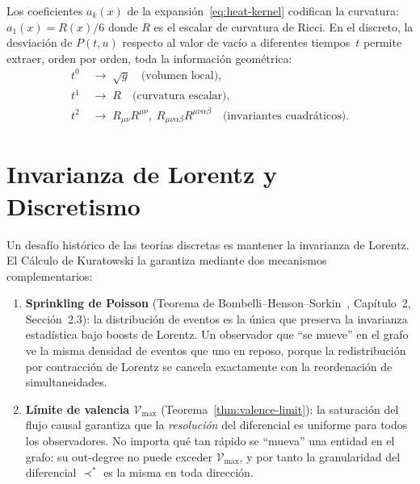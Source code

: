\documentclass[11pt, a4paper, openany]{book}
\newcommand{\covers}{\prec^{\!*}}
\begin{document}
\noindent
Los coeficientes $a_k(x)$ de la
expansi\'on~\eqref{eq:heat-kernel} codifican la curvatura:
$a_1(x) = R(x)/6$ donde $R$ es el escalar de curvatura de Ricci. En
el discreto, la desviaci\'on de $P(t,u)$ respecto al valor de vac\'io
a diferentes tiempos~$t$ permite extraer, orden por orden, toda la
informaci\'on geom\'etrica:
\begin{align}
  t^0 &\;\to\; \sqrt{g} \quad\text{(volumen local)},
  \label{eq:heat-order0}\\
  t^1 &\;\to\; R \quad\text{(curvatura escalar)},
  \label{eq:heat-order1}\\
  t^2 &\;\to\; R_{\mu\nu}R^{\mu\nu},\;
  R_{\mu\nu\alpha\beta}R^{\mu\nu\alpha\beta}
  \quad\text{(invariantes cuadr\'aticos)}.
  \label{eq:heat-order2}
\end{align}

\section{Invarianza de Lorentz y Discretismo}

Un desaf\'io hist\'orico de las teor\'ias discretas es mantener la
invarianza de Lorentz. El C\'alculo de Kuratowski la garantiza
mediante dos mecanismos complementarios:

\begin{enumerate}
  \item \textbf{Sprinkling de Poisson}
    (Teorema de
    Bombelli--Henson--Sorkin~\cite{bombelli2009}, Cap\'itulo~2,
    Secci\'on~2.3): la distribuci\'on de eventos es la \'unica que
    preserva la invarianza estad\'istica bajo boosts de Lorentz. Un
    observador que ``se mueve'' en el grafo ve la misma densidad de
    eventos que uno en reposo, porque la redistribuci\'on por
    contracci\'on de Lorentz se cancela exactamente con la
    reordenaci\'on de simultaneidades.

  \item \textbf{L\'imite de valencia $\mathcal{V}_{\max}$}
    (Teorema~\ref{thm:valence-limit}): la saturaci\'on del flujo
    causal garantiza que la \emph{resoluci\'on} del diferencial es
    uniforme para todos los observadores. No importa qu\'e tan
    r\'apido se ``mueva'' una entidad en el grafo: su out-degree no
    puede exceder $\mathcal{V}_{\max}$, y por tanto la granularidad
    del diferencial $\covers$ es la misma en toda direcci\'on.
\end{enumerate}
\end{document}
